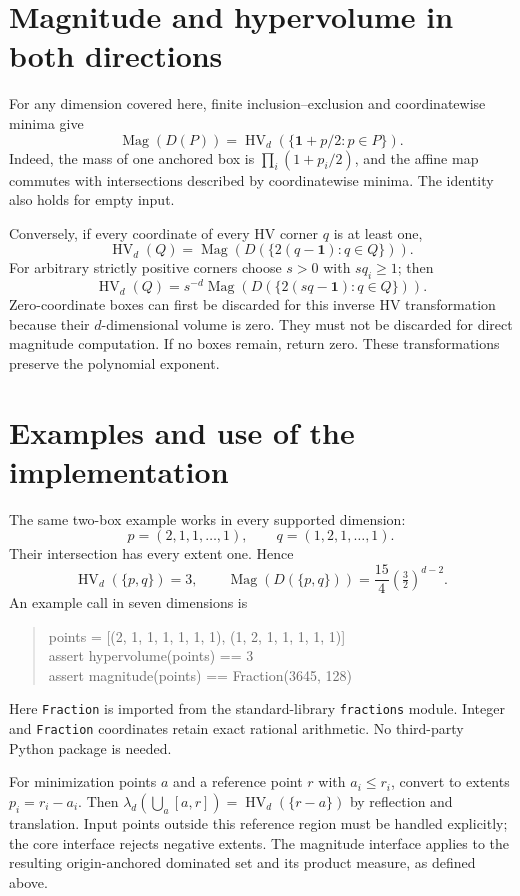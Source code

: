 \documentclass[12pt,a4paper]{article}
\newcommand{\HV}{\operatorname{HV}}
\newcommand{\Mag}{\operatorname{Mag}}
\newcommand{\1}{\mathbf1}
\begin{document}
\section{Magnitude and hypervolume in both directions}
For any dimension covered here, finite inclusion--exclusion and
coordinatewise minima give
\begin{equation}
            \Mag(D(P))=\HV_d(\{\1+p/2:p\in P\}).   \label{eq:affine}
\end{equation}
Indeed, the mass of one anchored box is $\prod_i(1+p_i/2)$, and the
affine map commutes with intersections described by coordinatewise minima.
The identity also holds for empty input.

Conversely, if every coordinate of every HV corner $q$ is at least one,
\[
                    \HV_d(Q)=\Mag(D(\{2(q-\1):q\in Q\})).
\]
For arbitrary strictly positive corners choose $s>0$ with $sq_i\ge1$;
then
\[
                  \HV_d(Q)=s^{-d}\Mag(D(\{2(sq-\1):q\in Q\})).
\]
Zero-coordinate boxes can first be discarded for this inverse HV
transformation because their $d$-dimensional volume is zero. They must
not be discarded for direct magnitude computation. If no boxes remain,
return zero. These transformations preserve the polynomial exponent.

\section{Examples and use of the implementation}\label{sec:usage}
The same two-box example works in every supported dimension:
\[
p=(2,1,1,\ldots,1),\qquad q=(1,2,1,\ldots,1).
\]
Their intersection has every extent one. Hence
\[
               \HV_d(\{p,q\})=3,\qquad
               \Mag(D(\{p,q\}))=\frac{15}{4}(\tfrac32)^{d-2}.
\]
An example call in seven dimensions is
\begin{quote}\ttfamily\small
points = [(2, 1, 1, 1, 1, 1, 1), (1, 2, 1, 1, 1, 1, 1)]\\
assert hypervolume(points) == 3\\
assert magnitude(points) == Fraction(3645, 128)
\end{quote}
Here \texttt{Fraction} is imported from the standard-library
\texttt{fractions} module. Integer and \texttt{Fraction} coordinates retain
exact rational arithmetic. No third-party Python package is needed.

For minimization points $a$ and a reference point $r$ with $a_i\le r_i$,
convert to extents $p_i=r_i-a_i$. Then
$\lambda_d(\bigcup_a[a,r])=\HV_d(\{r-a\})$ by reflection and translation.
Input points outside this reference region must be handled explicitly;
the core interface rejects negative extents. The magnitude interface
applies to the resulting origin-anchored dominated set and its product
measure, as defined above.
\end{document}
